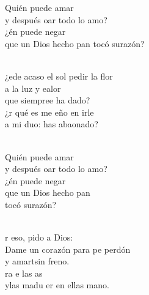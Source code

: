 \documentclass[12pt]{article}
\begin{document}
\begin{multicols*}{2}
\begin{cancion}%
	\begin{chorus}%
	Quién puede amar \\
	y después oar todo lo amo?\\
	¿én puede negar  \\
	que un Dios hecho pan tocó surazón?\\
	\end{chorus}%
	\jump\\
	¿ede acaso el sol pedir la flor \\
	a la luz y ealor \\
	que siempree ha dado?\\
	¿r qué es me eño en irle \\
	a mi duo: has abaonado?\\\jump\\
	\begin{chorus}%
	Quién puede amar \\
	y después oar todo lo amo? \\
	¿én puede negar  \\
que un Dios hecho pan \\
	tocó surazón?    \\
	\end{chorus}%
	\jump\\
	r eso, pido a Dios: \\
	Dame un corazón para pe perdón\\
	y amartsin freno.\\
	ra e las as \\
	ylas madu er en ellas  mano.\\
\end{cancion}%


\end{multicols*}
\end{document}
